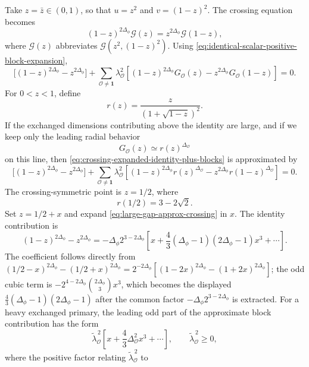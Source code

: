 Take \(z=\bar z\in(0,1)\), so that \(u=z^2\) and \(v=(1-z)^2\).  The crossing
equation becomes
\begin{equation}
  (1-z)^{2\Delta_\phi}\mathcal G(z)
  =
  z^{2\Delta_\phi}\mathcal G(1-z),
  \label{eq:real-line-identical-crossing}
\end{equation}
where \(\mathcal G(z)\) abbreviates \(\mathcal G(z^2,(1-z)^2)\).  Using
\eqref{eq:identical-scalar-positive-block-expansion},
\begin{equation}
  \bigl[(1-z)^{2\Delta_\phi}-z^{2\Delta_\phi}\bigr]
  +
  \sum_{\mathcal O\ne\mathbf1}
  \lambda_{\mathcal O}^2
  \left[
    (1-z)^{2\Delta_\phi}G_{\mathcal O}(z)
    -
    z^{2\Delta_\phi}G_{\mathcal O}(1-z)
  \right]
  =
  0.
  \label{eq:crossing-expanded-identity-plus-blocks}
\end{equation}
For \(0<z<1\), define
\[
  r(z)=\frac{z}{(1+\sqrt{1-z})^2}.
\]
If the exchanged dimensions contributing above the identity are large, and if
we keep only the leading radial behavior
\[
  G_{\mathcal O}(z)
  \simeq
  r(z)^{\Delta_{\mathcal O}}
\]
on this line, then \eqref{eq:crossing-expanded-identity-plus-blocks} is
approximated by
\begin{equation}
  \bigl[(1-z)^{2\Delta_\phi}-z^{2\Delta_\phi}\bigr]
  +
  \sum_{\mathcal O\ne\mathbf1}
  \lambda_{\mathcal O}^2
  \left[
    (1-z)^{2\Delta_\phi}r(z)^{\Delta_{\mathcal O}}
    -
    z^{2\Delta_\phi}r(1-z)^{\Delta_{\mathcal O}}
  \right]
  =
  0.
  \label{eq:large-gap-approx-crossing}
\end{equation}
The crossing-symmetric point is \(z=1/2\), where
\[
  r(1/2)=3-2\sqrt2.
\]
Set \(z=1/2+x\) and expand \eqref{eq:large-gap-approx-crossing} in \(x\).
The identity contribution is
\[
  (1-z)^{2\Delta_\phi}-z^{2\Delta_\phi}
  =
  -\Delta_\phi 2^{3-2\Delta_\phi}
  \left[
    x+\frac43(\Delta_\phi-1)(2\Delta_\phi-1)x^3+\cdots
  \right].
\]
The coefficient follows directly from
\((1/2-x)^{2\Delta_\phi}-(1/2+x)^{2\Delta_\phi}
=2^{-2\Delta_\phi}[(1-2x)^{2\Delta_\phi}-(1+2x)^{2\Delta_\phi}]\);
the odd cubic term is
\(-2^{4-2\Delta_\phi}\binom{2\Delta_\phi}{3}x^3\), which becomes the
displayed \(\frac43(\Delta_\phi-1)(2\Delta_\phi-1)\) after the common factor
\(-\Delta_\phi2^{3-2\Delta_\phi}\) is extracted.
For a heavy exchanged primary, the leading odd part of the approximate block
contribution has the form
\[
  \widetilde\lambda_{\mathcal O}^{\,2}
  \left[
    x+\frac43\Delta_{\mathcal O}^2x^3+\cdots
  \right],
  \qquad
  \widetilde\lambda_{\mathcal O}^{\,2}\ge0,
\]
where the positive factor relating
\(\widetilde\lambda_{\mathcal O}^{\,2}\) to
